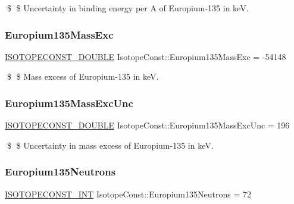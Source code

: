 \$ \$ Uncertainty in binding energy per A of Europium-\/135 in keV. \mbox{\label{group___isotope_const-_europium-_eu135_ga0eb4bee8e027f2f01256ae2588907eb7}} 
\subsubsection{\texorpdfstring{Europium135\+Mass\+Exc}{Europium135MassExc}}
{\footnotesize\ttfamily \mbox{\hyperlink{group___isotope_const-_macros_ga8f45a7272ce02c0b4c65c44636ed719a}{I\+S\+O\+T\+O\+P\+E\+C\+O\+N\+S\+T\+\_\+\+D\+O\+U\+B\+LE}} Isotope\+Const\+::\+Europium135\+Mass\+Exc = -\/54148}

\$ \$ Mass excess of Europium-\/135 in keV. \mbox{\label{group___isotope_const-_europium-_eu135_gafa6b69ad1bca3bb23f08cf45b255d30e}} 
\subsubsection{\texorpdfstring{Europium135\+Mass\+Exc\+Unc}{Europium135MassExcUnc}}
{\footnotesize\ttfamily \mbox{\hyperlink{group___isotope_const-_macros_ga8f45a7272ce02c0b4c65c44636ed719a}{I\+S\+O\+T\+O\+P\+E\+C\+O\+N\+S\+T\+\_\+\+D\+O\+U\+B\+LE}} Isotope\+Const\+::\+Europium135\+Mass\+Exc\+Unc = 196}

\$ \$ Uncertainty in mass excess of Europium-\/135 in keV. \mbox{\label{group___isotope_const-_europium-_eu135_gaf9a01cb8b79ad7a6c676ab123f66e26d}} 
\subsubsection{\texorpdfstring{Europium135\+Neutrons}{Europium135Neutrons}}
{\footnotesize\ttfamily \mbox{\hyperlink{group___isotope_const-_macros_ga5f18360b3e99483a35c32d789e62621c}{I\+S\+O\+T\+O\+P\+E\+C\+O\+N\+S\+T\+\_\+\+I\+NT}} Isotope\+Const\+::\+Europium135\+Neutrons = 72}

